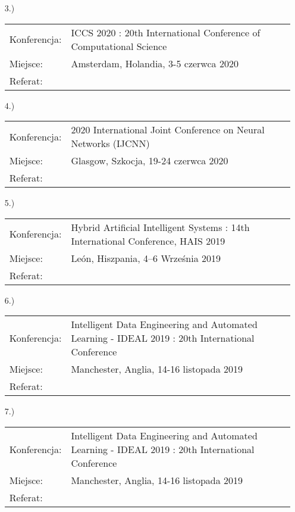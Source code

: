 \begin{fullwidth}
\begin{itemize}
	\item[3.)]~\\
	
	\begin{tabular}{p{7em}p{32.5em}}
	Konferencja:& ICCS 2020 : 20th International Conference of Computational Science\\
	Miejsce: & Amsterdam, Holandia, 3-5 czerwca 2020\\
	Referat: & \textbf{\fullcite{Ksi20b}}			
	\end{tabular}
	
	\item[4.)]~\\
	
	\begin{tabular}{p{7em}p{32.5em}}
	Konferencja:& 2020 International Joint Conference on Neural Networks (IJCNN)\\
	Miejsce: & Glasgow, Szkocja, 19-24 czerwca 2020\\
	Referat: & \textbf{\fullcite{C5}}			
	\end{tabular}\newpage

	\item[5.)]~\\
	
	\begin{tabular}{p{7em}p{32.5em}}
	Konferencja:& Hybrid Artificial Intelligent Systems : 14th International Conference, HAIS 2019\\
	Miejsce: & León, Hiszpania, 4–6 Września 2019\\
	Referat: & \textbf{\fullcite{C6}}		
	\end{tabular}%

	\item[6.)]~\\
	
	\begin{tabular}{p{7em}p{32.5em}}
	Konferencja:& Intelligent Data Engineering and Automated Learning - IDEAL 2019 : 20th International Conference\\
	Miejsce: & Manchester, Anglia, 14-16 listopada 2019\\
	Referat: & \textbf{\fullcite{Koz19}}
	\end{tabular}


	\item[7.)]~\\
	
	\begin{tabular}{p{7em}p{32.5em}}
	Konferencja:& Intelligent Data Engineering and Automated Learning - IDEAL 2019 : 20th International Conference\\
	Miejsce: & Manchester, Anglia, 14-16 listopada 2019\\
	Referat: & \textbf{\fullcite{Ksi19f}}	
	\end{tabular}


\end{itemize}
\end{fullwidth}
